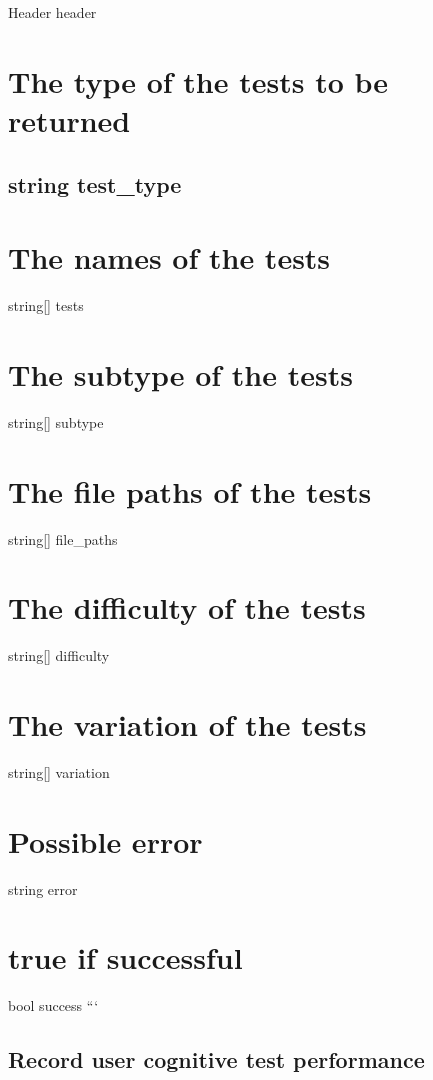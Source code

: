 Header header \section*{The type of the tests to be returned}

\subsection*{string test\-\_\-type }

\section*{The names of the tests}

string\mbox{[}\mbox{]} tests \section*{The subtype of the tests}

string\mbox{[}\mbox{]} subtype \section*{The file paths of the tests}

string\mbox{[}\mbox{]} file\-\_\-paths \section*{The difficulty of the tests}

string\mbox{[}\mbox{]} difficulty \section*{The variation of the tests}

string\mbox{[}\mbox{]} variation \section*{Possible error}

string error \section*{true if successful}

bool success ```

\subsection*{Record user cognitive test performance}

